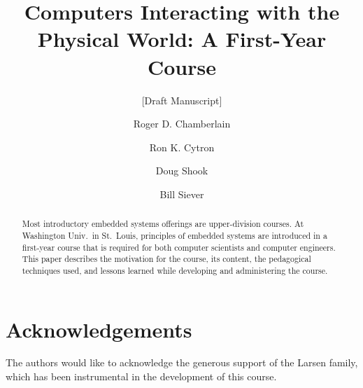 \documentclass[runningheads]{llncs}
\begin{document}
%
\title{Computers Interacting with the Physical World: A First-Year Course}
\subtitle{[Draft Manuscript]}
%
%
\author{Roger D. Chamberlain%
\and
Ron K. Cytron%
\and
Doug Shook%
\and
Bill Siever%
}
%
%
%

\maketitle              %
%
\begin{abstract}
Most introductory embedded systems offerings are upper-division courses.
At Washington Univ.~in St.~Louis,
principles of embedded systems are introduced in a first-year course that
is required for both computer scientists and computer engineers.
This paper describes the motivation for the course, its content,
the pedagogical techniques used, and lessons learned while developing
and administering the course.

\end{abstract}
%
%
%








\section*{Acknowledgements}
The authors would like to acknowledge
the generous support of the Larsen family, which has been instrumental
in the development of this course.


%
%
%


%
\end{document}
